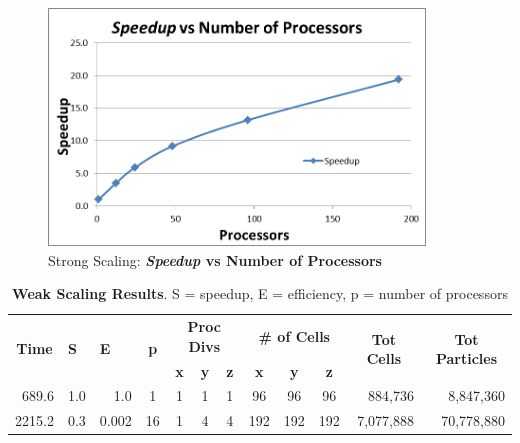 \documentclass[]{article}
\begin{document}
\begin{figure}[h!]
    \centering
    \includegraphics[width=10cm]{strong_speedup.png}
    \caption{Strong Scaling: \textbf{\textit{Speedup} vs Number of Processors}}
\end{figure}

\begin{table}[h!]
\centering
\begin{tabular}{|r|r|r|c|c|c|c|c|c|c|r|r|}
\hline
\multicolumn{1}{|c|}{\multirow{2}{*}{\textbf{Time}}} & \multicolumn{1}{l|}{\multirow{2}{*}{\textbf{S}}} & \multicolumn{1}{l|}{\multirow{2}{*}{\textbf{E}}} & \multirow{2}{*}{\textbf{p}} & \multicolumn{3}{c|}{\textbf{Proc Divs}} & \multicolumn{3}{c|}{\textbf{\# of Cells}} & \multicolumn{1}{c|}{\multirow{2}{*}{\textbf{Tot Cells}}} & \multicolumn{1}{c|}{\multirow{2}{*}{\textbf{Tot Particles}}} \\ \cline{5-10}
\multicolumn{1}{|c|}{}                               & \multicolumn{1}{l|}{}                            & \multicolumn{1}{l|}{}                            &                             & \textbf{x}  & \textbf{y}  & \textbf{z}  & \textbf{x}   & \textbf{y}   & \textbf{z}  & \multicolumn{1}{c|}{}                                    & \multicolumn{1}{c|}{}                                        \\ \hline
689.6                                                    & 1.0                                                & 1.0                                                & 1                           & 1           & 1           & 1           & 96           & 96           & 96          & 884,736                                                  & 8,847,360                                                    \\ \hline
2215.2                                                 & 0.3                                                & 0.002                                                & 16                          & 1           & 4           & 4           & 192          & 192          & 192         & 7,077,888                                                & 70,778,880                                                    \\ \hline
\end{tabular}
\caption{\textbf{Weak Scaling Results}. S = speedup, E = efficiency, p = number of processors}
\end{table}
\end{document}
